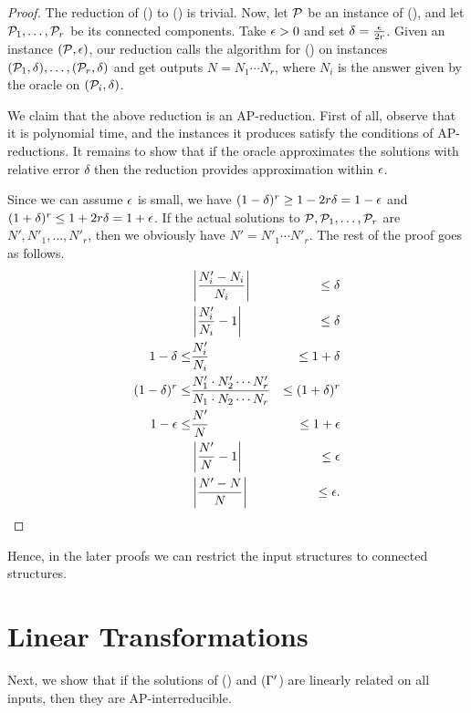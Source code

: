 \begin{proof}
The reduction of \cccsp(\mrelset) to \ccsp(\mrelset) is trivial. Now, let \(\mathcal{P}\) be an instance of
\ccsp(\mrelset), and let \(\mathcal{P}_1,\dotsc,\mathcal{P}_r\) be its connected components. Take \(\epsilon > 0\) 
and set \(\delta = \frac{\epsilon}{2r}\)\@. Given an instance \((\mathcal{P},\epsilon)\), our reduction calls
the algorithm for \cccsp(\mrelset) on instances \((\mathcal{P}_1,\delta), \dotsc,(\mathcal{P}_r,\delta)\) 
and get outputs \(N = N_1 \dotsm N_r\),
where \(N_i\) is the answer given by the oracle on \((\mathcal{P}_i,\delta)\)\@.

We claim that the above reduction is an AP-reduction. First of all, observe that it is polynomial
time, and the instances it produces satisfy the conditions of AP-reductions. It remains to show
that if the oracle approximates the solutions with relative error \(\delta\) then the reduction 
provides approximation within \(\epsilon\)\@.

Since we can assume \(\epsilon\) is small, we have \((1 - \delta)^r \ge 1 - 2r\delta = 1 - \epsilon \) and
\( ( 1 + \delta)^r \le 1 + 2r\delta = 1 + \epsilon\)\@. If 
the actual solutions to \(\mathcal{P}, \mathcal{P}_1,\dotsc,\mathcal{P}_r\) are \(N',N'_1,\dotsc,N'_r\), then 
we obviously have \(N'=N'_1\dotsm N'_r\)\@. The rest of the proof goes as follows.
\begin{eqnarray*}
&\left|\frac{N'_i - N_i}{N_i}\right| &\le \delta \\
&\left|\frac{N'_i}{N_i} -1 \right| &\le \delta \\
1 - \delta  \le &\frac{N'_i}{N_i} &\le 1 + \delta \\
(1-\delta)^r \le &\frac{N'_1\cdot N'_2 \dotsm N'_r}{N_1\cdot N_2 \dotsm N_r} &\le (1 + \delta)^r \\
1-\epsilon \le &\frac{N'}{N} &\le 1+\epsilon \\
&\left|\frac{N'}{N}-1\right|&\le \epsilon\\
&\left|\frac{N'-N}{N}\right|&\le \epsilon.
\end{eqnarray*}
\end{proof}
Hence, in the later proofs we can restrict the input structures to connected structures.
\section{Linear Transformations}
Next, we show that if the solutions of \ccsp(\mrelset) and \ccsp(\(\Gamma'\)) are linearly related on all inputs,
then they are AP-interreducible. 

